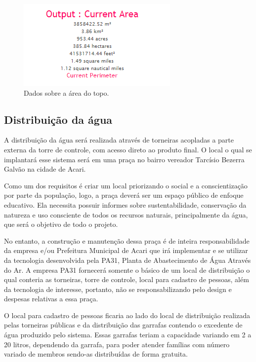     \begin{figure}[h]
    \begin{center}
      \includegraphics[scale=0.8]{editaveis/figuras/mapa_area_2_dados}
      \caption[Dados sobre a área do topo]{Dados sobre a área do topo. \footnotemark}
      \label{mapa_area_2_dados}
    \end{center}
    \end{figure}
    \FloatBarrier
   
   \subsection{Distribuição da água}
   
    A distribuição da água será realizada através de torneiras acopladas a parte externa da torre de controle, com acesso direto ao produto final. O local o qual se implantará esse sistema será em uma praça no bairro vereador Tarcísio Bezerra Galvão na cidade de Acari.
    
    Como um dos requisitos é criar um local priorizando o social e a conscientização por parte da população, logo, a praça deverá ser um espaço público de enfoque educativo. Ela necessita possuir informes sobre sustentabilidade, conservação da natureza e uso consciente de todos os recursos naturais, principalmente da água, que será o objetivo de todo o projeto.
    
    No entanto, a construção e manutenção dessa praça é de inteira responsabilidade da empresa e/ou Prefeitura Municipal de Acari que irá implementar e se utilizar da tecnologia desenvolvida pela PA31, Planta de Abastecimento de Água Através do Ar. A empresa PA31 fornecerá somente o básico de um local de distribuição o qual conteria as torneiras, torre de controle, local para cadastro de pessoas, além da tecnologia de interesse, portanto, não se responsabilizando pelo design e despesas relativas a essa praça.
      
    O local para cadastro de pessoas ficaria ao lado do local de distribuição realizada pelas torneiras públicas e da distribuição das garrafas contendo o excedente de água produzido pelo sistema. Essas garrafas teriam a capacidade variando em 2 a 20 litros, dependendo da garrafa, para poder atender famílias com número variado de membros sendo-as distribuídas de forma gratuita. 
    
